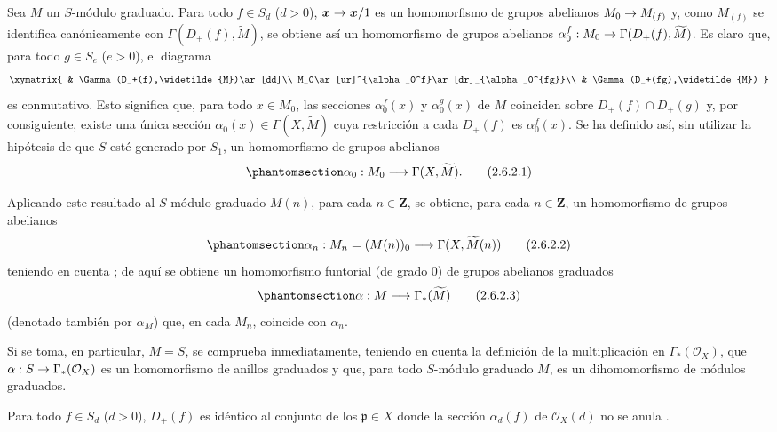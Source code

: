 \documentclass[oneside,10pt]{amsart}
\makeatletter
\newcommand{\ega@arrow}[2]{\mathchoice{#1}{#2}{#2}{#2}}
\renewcommand{\to}{\ega@arrow{\longrightarrow}{\rightarrow}}
\newcommand{\oldpage}[2][]{\marginnote{\normalfont\footnotesize\textbf{#1}~|~#2}\ignorespaces}
\let\EGAOriginalLabel\label
\renewcommand{\label}[1]{\phantomsection\EGAOriginalLabel{#1}}
\makeatother
\begin{document}
\begin{env}[2.6.2]
\label{II.2.6.2-fr}
Sea $M$ un $S$-módulo graduado.
Para todo $f\in S_d$ ($d>0$), $\boldsymbol{x}\to\boldsymbol{x}/1$ es un homomorfismo de grupos abelianos $M_0\to M_{(f)}$ y, como $M_{(f)}$ se identifica canónicamente
\oldpage[II]{37}
con $\Gamma(D_+(f),\widetilde{M})$, se obtiene así un homomorfismo de grupos abelianos
$\alpha_0^f:M_0\to\Gamma(D_+(f),\widetilde{M})$.
Es claro que, para todo $g\in S_e$ ($e>0$), el diagrama
\[
  \xymatrix{
    & \Gamma(D_+(f),\widetilde{M})\ar[dd]\\
    M_0\ar[ur]^{\alpha_0^f}\ar[dr]_{\alpha_0^{fg}}\\
    & \Gamma(D_+(fg),\widetilde{M})
  }
\]
es conmutativo.
Esto significa que, para todo $x\in M_0$, las secciones $\alpha_0^f(x)$ y $\alpha_0^g(x)$ de $M$ coinciden sobre $D_+(f)\cap D_+(g)$ y, por consiguiente, existe una única sección $\alpha_0(x)\in\Gamma(X,\widetilde{M})$ cuya restricción a cada $D_+(f)$ es $\alpha_0^f(x)$.
Se ha definido así, sin utilizar la hipótesis de que $S$ esté generado por $S_1$, un homomorfismo de grupos abelianos
\[
\label{II.2.6.2.1-fr}
  \alpha_0:M_0\longrightarrow\Gamma(X,\widetilde{M}).
\tag{2.6.2.1}
\]

Aplicando este resultado al $S$-módulo graduado $M(n)$, para cada $n\in\mathbf{Z}$, se obtiene, para cada $n\in\mathbf{Z}$, un homomorfismo de grupos abelianos
\[
\label{II.2.6.2.2-fr}
  \alpha_n:M_n=(M(n))_0\longrightarrow\Gamma(X,\widetilde{M}(n))
\tag{2.6.2.2}
\]
teniendo en cuenta ; de aquí se obtiene un homomorfismo funtorial (de grado $0$) de grupos abelianos graduados
\[
\label{II.2.6.2.3-fr}
  \alpha:M\longrightarrow\Gamma_*(\widetilde{M})
\tag{2.6.2.3}
\]
(denotado también por $\alpha_M$) que, en cada $M_n$, coincide con $\alpha_n$.

Si se toma, en particular, $M=S$, se comprueba inmediatamente, teniendo en cuenta la definición  de la multiplicación en $\Gamma_*(\mathcal{O}_X)$, que $\alpha:S\to\Gamma_*(\mathcal{O}_X)$ es un homomorfismo de anillos graduados y que, para todo $S$-módulo graduado $M$,  es un dihomomorfismo de módulos graduados.
\end{env}

\begin{proposition}[2.6.3]
\label{II.2.6.3-fr}
Para todo $f\in S_d$ ($d>0$), $D_+(f)$ es idéntico al conjunto de los $\mathfrak{p}\in X$ donde la sección $\alpha_d(f)$ de $\mathcal{O}_X(d)$ no se anula .
\end{proposition}
\end{document}
